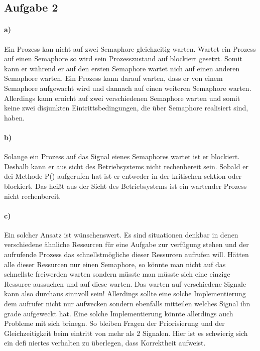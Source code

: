 \subsection*{Aufgabe 2}

\paragraph*{a)}

Ein Prozess kan nicht auf zwei Semaphore gleichzeitig warten. Wartet ein Prozess auf einen Semaphore so wird sein Prozesszustand auf blockiert gesetzt. Somit kann er während er auf den ersten Semaphore wartet nich auf einen anderen Semaphore warten. 
Ein Prozess kann darauf warten, dass er von einem Semaphore aufgewacht wird und dannach auf einen weiteren Semaphore warten. Allerdings kann ernicht auf zwei verschiedenen Semaphore warten und somit keine zwei disjunkten Eintrittsbedingungen, die über Semaphore realisiert sind, haben.

\paragraph*{b)}

Solange ein Prozess auf das Signal eienes Semaphores wartet ist er blockiert. Deshalb kann er aus sicht des Betriebsystems nicht rechenbereit sein. Sobald er dei Methode P() aufgerufen hat ist er entweder in der kritischen sektion oder blockiert. Das heißt aus der Sicht des Betriebsystems ist ein wartender Prozess nicht rechenbereit.


\paragraph*{c)}

Ein solcher Ansatz ist wünschenswert. Es sind situationen denkbar in denen verschiedene ähnliche Ressurcen für eine Aufgabe zur verfügung stehen und der aufrufende Prozess das schnellstmögliche dieser Ressurcen aufrufen will. Hätten alle dieser Ressurcen nur einen Semaphore, so könnte man nicht auf das schnellste freiwerden warten sondern müsste man müsste sich eine einzige Ressurce aussuchen und auf diese warten. Das warten auf verschiedene Signale kann also durchaus sinnvoll sein! Allerdings sollte eine solche Implementierung dem aufrufer nicht nur aufwecken sondern ebenfalls mitteilen welches Signal ihn grade aufgeweckt hat. Eine solche Implementierung könnte allerdings auch Probleme mit sich brinegn. So bleiben Fragen der Priorisierung und der Gleichzeitigkeit beim eintritt von mehr als 2 Signalen. Hier ist es schwierig sich ein defi niertes verhalten zu überlegen, dass Korrektheit aufweist.
